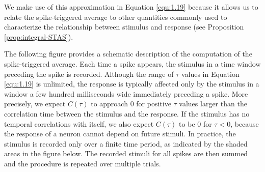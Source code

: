 \begin{rem}
   We make use of this approximation in Equation \ref{equ:1.19} because it allows us to relate the spike-triggered average to other 
   quantities commonly used to characterize the relationship between stimulus and response (see Proposition \ref{prop:integral-STAS}).
\end{rem}

\begin{exm}
  \label{exm:compute-SpiTriAve}
  The following figure provides a schematic description of the computation of the spike-triggered average. Each time a 
  spike appears, the stimulus in a time window preceding the spike is recorded. Although the range of $\tau$ 
  values in Equation \ref{equ:1.19} is unlimited, the response is typically affected only by the stimulus in a window 
  a few hundred milliseconds wide immediately preceding a spike. More precisely, we expect $C(\tau)$ to approach $0$ 
  for positive $\tau$ values larger than the correlation time between the stimulus and the response. If the 
  stimulus has no temporal correlations with itself, we also expect $C(\tau)$ to be $0$ for $\tau < 0$, because 
  the response of a neuron cannot depend on future stimuli. In practice, the stimulus is recorded only over a 
  finite time period, as indicated by the shaded areas in the figure below.
  The recorded stimuli for all 
  spikes are then summed and the procedure is repeated over multiple trials.
\end{exm}
